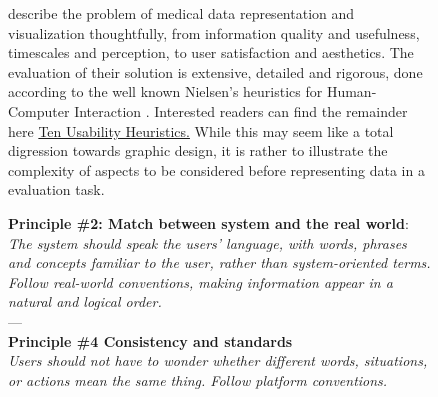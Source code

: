 \begin{figure}
    \footnotesize
\noindent
{}
\begin{tcolorbox}[sidebyside,arc=0.5mm, 
    colback=MidnightBlue!10!white, 
    coltext=MidnightBlue!90!black,  
    colframe=MidnightBlue!90!black,
    colbacktitle=MidnightBlue!80,
    leftrule=0mm,
    rightrule=0mm, 
    toprule=0mm, 
    bottomrule=0mm,
    box align=top,
    title={\begin{panel}Representation and visualisation \label{pan:visualisation}\end{panel}}]

\citeauthor{Ledesma2016-hn} describe the problem of medical data representation and visualization thoughtfully, from information quality and usefulness, timescales and perception, to user satisfaction and aesthetics. The evaluation of their solution is extensive, detailed and rigorous, done according to the well known Nielsen's heuristics for Human-Computer Interaction \cite{nielsend}.  Interested readers can find the remainder here \href{https://www.nngroup.com/articles/ten-usability-heuristics/}{Ten Usability Heuristics.} While this may seem like a total digression towards graphic design, it is rather to illustrate the complexity of aspects to be considered before representing data in a evaluation task.
\tcblower

\textbf{Principle \#2: Match between system and the real world}:\\ \textit{The system should speak the users' language, with words, phrases and concepts familiar to the user, rather than system-oriented terms. Follow real-world conventions, making information appear in a natural and logical order. }
\\
---
\\
\textbf{Principle \#4 Consistency and standards}\\
\textit{Users should not have to wonder whether different words, situations, or actions mean the same thing. Follow platform conventions.
}

\end{tcolorbox}
\normalsize
\end{figure}